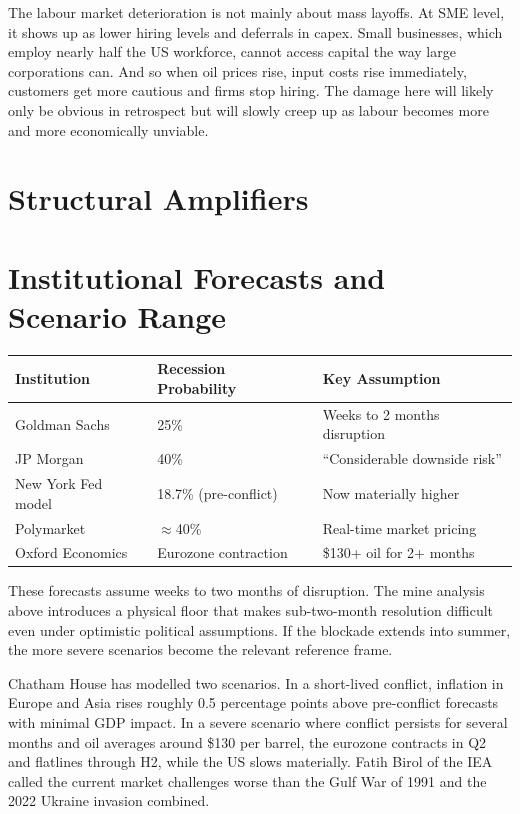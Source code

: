\documentclass[12pt,a4paper]{article}
\begin{document}
The labour market deterioration is not mainly about mass layoffs. At SME level, it shows up as lower hiring levels and deferrals in capex. Small businesses, which employ nearly half the US workforce, cannot access capital  the way large corporations can. And so when oil prices rise, input costs rise immediately, customers get more cautious  and firms stop hiring. The damage here will likely only be obvious in retrospect but will slowly creep up as labour becomes more and more economically unviable.


\section{Structural Amplifiers}




\section{Institutional Forecasts and Scenario Range}

\begin{center}
\begin{tabular}{lll}
\toprule
\textbf{Institution} & \textbf{Recession Probability} & \textbf{Key Assumption} \\
\midrule
Goldman Sachs & 25\% & Weeks to 2 months disruption \\
JP Morgan & 40\% & ``Considerable downside risk'' \\
New York Fed model & 18.7\% (pre-conflict) & Now materially higher \\
Polymarket & $\approx$40\% & Real-time market pricing \\
Oxford Economics & Eurozone contraction & \$130+ oil for 2+ months \\
\bottomrule
\end{tabular}
\end{center}

These forecasts assume weeks to two months of disruption. The mine analysis above introduces a physical floor that makes sub-two-month resolution difficult even under optimistic political assumptions. If the blockade extends into summer, the more severe scenarios become the relevant reference frame.

Chatham House has modelled two scenarios. In a short-lived conflict, inflation in Europe and Asia rises roughly 0.5 percentage points above pre-conflict forecasts with minimal GDP impact. In a severe scenario where conflict persists for several months and oil averages around \$130 per barrel, the eurozone contracts in Q2 and flatlines through H2, while the US slows materially. Fatih Birol of the IEA called the current market challenges worse than the Gulf War of 1991 and the 2022 Ukraine invasion combined.
\end{document}

